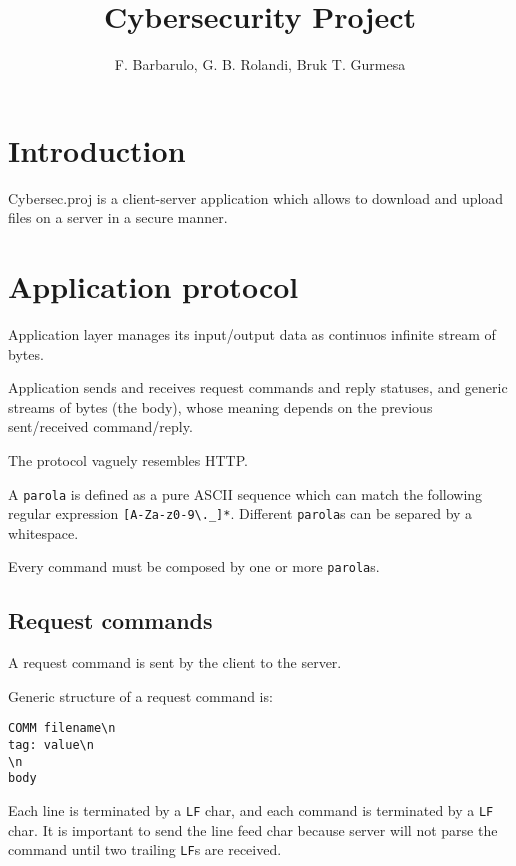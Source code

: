 \documentclass[a4paper,12pt]{article}
\title{Cybersecurity Project}
\author{F. Barbarulo, G. B. Rolandi, Bruk T. Gurmesa}
\newcommand{\projectname}{Cybersec.proj}
\begin{document}
\maketitle
\tableofcontents

\clearpage

\section{Introduction}
\projectname{} is a client-server application which allows to download and upload files on a server in a secure manner.

\section{Application protocol}
Application layer manages its input/output data as continuos infinite stream of bytes.

Application sends and receives request commands and reply statuses, and generic streams of bytes (the body), whose meaning depends on the previous sent/received command/reply.

The protocol vaguely resembles HTTP.

A \texttt{parola} is defined as a pure ASCII sequence which can match the following regular expression \texttt{[A-Za-z0-9\textbackslash.\_]*}.
Different \texttt{parola}s can be separed by a whitespace.

Every command must be composed by one or more \texttt{parola}s.

\subsection{Request commands}
A request command is sent by the client to the server.

Generic structure of a request command is:
\begin{verbatim}
COMM filename\n
tag: value\n
\n
body
\end{verbatim}

Each line is terminated by a \texttt{LF} char, and each command is terminated by a \texttt{LF} char.
It is important to send the line feed char because server will not parse the command until two trailing \texttt{LF}s are received.
\end{document}
